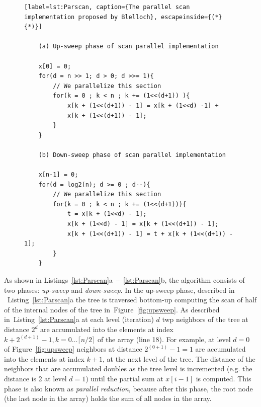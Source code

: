\documentclass[Ingles]{ic-tese-v1}
\newcommand{\rfig}[1]{Figure~\ref{fig:#1}}
\newcommand{\rlsts}[2]{Listing~\ref{lst:#1}{#2}}
\newcommand{\rlstn}[3]{Listings~\ref{lst:#1}{#2}~--~\ref{lst:#1}{#3}}
\begin{document}
\begin{figure}[t]
	\lstset{basicstyle=\scriptsize}
	\begin{lstlisting}[label=lst:Parscan, caption={The parallel scan implementation proposed by Blelloch}, escapeinside={(*}{*)}]

	(a) Up-sweep phase of scan parallel implementation

	x[0] = 0;
	for(d = n >> 1; d > 0; d >>= 1){
		// We parallelize this section
		for(k = 0 ; k < n ; k += (1<<(d+1)) ){
			x[k + (1<<(d+1)) - 1] = x[k + (1<<d) -1] +
			x[k + (1<<(d+1)) - 1];
		}
	}

	(b) Down-sweep phase of scan parallel implementation

	x[n-1] = 0;
	for(d = log2(n); d >= 0 ; d--){
		// We parallelize this section
		for(k = 0 ; k < n ; k += (1<<(d+1))){
			t = x[k + (1<<d) - 1];
			x[k + (1<<d) - 1] = x[k + (1<<(d+1)) - 1];
			x[k + (1<<(d+1)) - 1] = t + x[k + (1<<(d+1)) - 1];
		}
	}
	\end{lstlisting}
\end{figure}

As  shown  in \rlstn{Parscan}{a}{b},  the  algorithm  consists of  two phases:
\textit{up-sweep} and  \textit{down-sweep}.  In  the up-sweep phase,  described
in  ~\rlsts{Parscan}{a}  the  tree   is  traversed bottom-up computing the scan
of half of the internal nodes of the tree in~\rfig{upsweep}.  As described
in~\rlsts{Parscan}{a} at each level (iteration)  $d$  twp  neighbors of   the  tree
at   distance  $2^d$  are accumulated       into        the       elements
at       index $k + 2^{(d+1)} - 1, k = 0 \ldots \lceil n/2 \rceil$ of the array
(line 18). For  example, at  level $d  = 0$  of \rfig{upsweep}  neighbors at
distance $2^{(0+1)}  - 1  = 1$  are accumulated  into the  elements at index $k
+ 1$, at the  next level of  the tree.  The distance  of the neighbors  that
are   accumulated  doubles  as  the   tree  level  is incremented  (e.g.  the
distance is  2 at  level $d  = 1$)  until the partial sum  at $x[i-1]$  is
computed.   This phase  is also  known as \textit{parallel reduction},  because
after this phase,  the root node (the last node in the array) holds the sum of
all nodes in the array.
\end{document}
